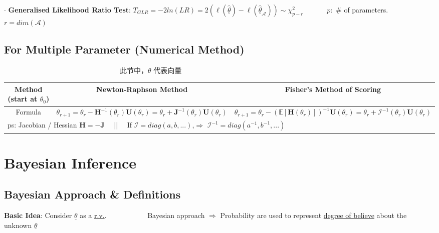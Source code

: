 \documentclass[9pt]{article}
\begin{document}
\vspace{-1pt}
$\cdot$ \textbf{Generalised Likelihood Ratio Test}: $T_{GLR}=-2ln(LR)=2\left(\ell(\widehat{\underline{\theta}})-\ell(\widehat{\underline{\theta}}_{\mathcal{A}})\right)\sim\chi^2_{p-r}$ \ \ \ \ \ \ $p:$ \# of parameters. \ \ $r=dim(\mathcal{A})$

\subsection{For Multiple Parameter (Numerical Method)}

\vspace{-0.10cm}
{\ \ \ \ \ \ \ \ \ \ \ \ \ \ \ \ \ \ \ \ \ \ \ \ \ \ \ \ \ \ \ \ \ \tiny * 此节中，$\theta$ 代表向量}
\vspace{-0.30cm}

\vspace{-0.35cm}
\begin{longtable}{|c|c|c|}
    \hline
    Method {\tiny (start at $\theta_0$)} & Newton-Raphson Method & Fisher's Method of Scoring \\
    \hline
    Formula & $\theta_{r+1}=\theta_r - \mathbf{H}^{-1}(\theta_r)\mathbf{U}(\theta_r)=\theta_r + \mathbf{J}^{-1}(\theta_r)\mathbf{U }(\theta_r)$ & $\theta_{r+1}=\theta_r-(\mathbb{E}[\mathbf{H}(\theta_r)])^{-1}\mathbf{U}(\theta_r)=\theta_r+\mathbf{\mathcal{I}}^{-1}(\theta_r)\mathbf{U}(\theta_r)$ \\
    \hline
    \multicolumn{3}{|l|}{\small ps: Jacobian / Hessian $\mathbf{H}=-\mathbf{J}$ \ \ || \ \ If $\mathbf{\mathcal{I}}=diag(a,b,...)$,$\Rightarrow$ $\mathbf{\mathcal{I}}^{-1}=diag(a^{-1},b^{-1},...)$} \\
    \hline
\end{longtable}
\vspace{-15pt}


\section{Bayesian Inference}
\vspace{-5pt}

\subsection{Bayesian Approach \& Definitions}

\textbf{Basic Idea}: {\small Consider $\underline{\theta}$ as a \underline{r.v.}. \ \ \ \ \ \ \ \ \ \ \ Bayesian approach $\Rightarrow$ Probability are used to represent \underline{degree of believe} about the unknown $\underline{\theta}$}
\end{document}
